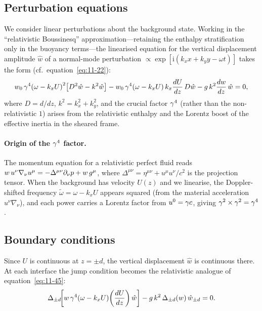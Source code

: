 \subsection{Perturbation equations}

We consider linear perturbations about the background state.
Working in the ``relativistic Boussinesq'' approximation---retaining
the enthalpy stratification only in the buoyancy terms---the
linearised equation for the vertical displacement amplitude $\hat{w}$
of a normal-mode perturbation $\propto\exp[\mathrm{i}(k_{x}x+k_{y}y-\omega t)]$
takes the form (cf.\ equation~\eqref{eq:11-22}):
\begin{equation}
\label{eq:rel-11-6}
w_{0}\,\gamma^{4}\!\left(\omega - k_{x}U\right)^{2}
\!\left[D^{2}\hat{w} - k^{2}\hat{w}\right]
- w_{0}\,\gamma^{4}\!\left(\omega-k_{x}U\right)
k_{x}\frac{dU}{dz}\,D\hat{w}
- g\,k^{2}\frac{dw}{dz}\,\hat{w} = 0,
\end{equation}
where $D=d/dz$, $k^{2}=k_{x}^{2}+k_{y}^{2}$, and the crucial
factor $\gamma^{4}$ (rather than the non-relativistic $1$) arises from
the relativistic enthalpy and the Lorentz boost of the effective
inertia in the sheared frame.

\paragraph{Origin of the $\gamma^{4}$ factor.}
The momentum equation for a relativistic perfect fluid reads
$w\,u^{\nu}\nabla_{\nu}u^{\mu}=-\Delta^{\mu\nu}\partial_{\nu}p
+ w\,g^{\mu}$, where $\Delta^{\mu\nu}=\eta^{\mu\nu}+
u^{\mu}u^{\nu}/c^{2}$ is the projection tensor.  When the background
has velocity $U(z)$ and we linearise, the Doppler-shifted frequency
$\tilde{\omega}=\omega-k_{x}U$ appears squared (from the material
acceleration $u^{\nu}\nabla_{\nu}$), and each power carries a Lorentz
factor from $u^{0}=\gamma c$, giving $\gamma^{2}\times\gamma^{2}=\gamma^{4}$.

\subsection{Boundary conditions}

Since $U$ is continuous at $z=\pm d$, the vertical displacement $\hat{w}$
is continuous there.  At each interface the jump condition becomes the
relativistic analogue of equation~\eqref{eq:11-45}:
\begin{equation}
\label{eq:rel-11-7}
\Delta_{\pm d}\!\biggl[
  w\,\gamma^{4}\!\left(\omega-k_{x}U\right)
  \!\left(\frac{dU}{dz}\right)\hat{w}
\biggr]
- g\,k^{2}\,\Delta_{\pm d}(w)\,\hat{w}_{\pm d} = 0.
\end{equation}

